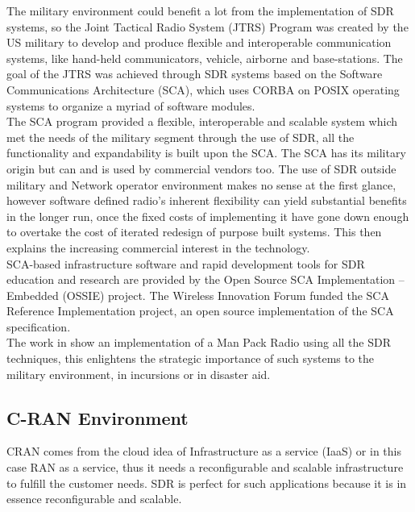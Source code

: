The military environment could benefit a lot from the implementation of SDR
systems, so the Joint Tactical Radio System (JTRS) Program was created by the US
military to develop and produce flexible and interoperable communication
systems, like hand-held communicators, vehicle, airborne and base-stations. The
goal of the JTRS was achieved through SDR systems based on the Software
Communications Architecture (SCA), which uses CORBA on POSIX operating systems
to organize a myriad of software modules.\\

The SCA program provided a flexible, interoperable and scalable system which met
the needs of the military segment through the use of SDR, all the functionality
and expandability is built upon the SCA. The SCA has its military origin but can
and is used by commercial vendors too. The use of SDR outside military and
Network operator environment makes no sense at the first glance, however
software defined radio's inherent flexibility can yield substantial benefits in
the longer run, once the fixed costs of implementing it have gone down enough to
overtake the cost of iterated redesign of purpose built systems. This then
explains the increasing commercial interest in the technology.\\

SCA-based infrastructure software and rapid development tools for SDR education
and research are provided by the Open Source SCA Implementation – Embedded
(OSSIE) project. The Wireless Innovation Forum funded the SCA Reference
Implementation project, an open source implementation of the SCA specification.\\

The work in \cite{Chamberlain2005} show an implementation of a Man Pack Radio
using all the SDR techniques, this enlightens the strategic importance of such
systems to the military environment, in incursions or in disaster aid.

\subsection{C-RAN Environment}

CRAN comes from the cloud idea of Infrastructure as a service (IaaS) or in this
case RAN as a service, thus it needs a reconfigurable and scalable
infrastructure to fulfill the customer needs. SDR is perfect for such
applications because  it is in essence reconfigurable and scalable.\\

